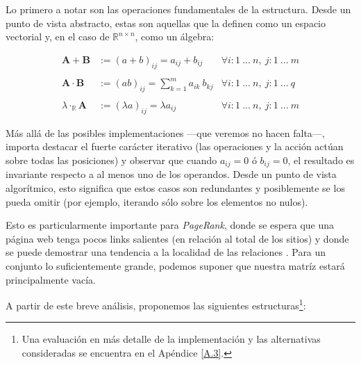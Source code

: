 Lo primero a notar son las operaciones fundamentales de la estructura. Desde un punto de vista abstracto, estas son aquellas que la definen como un espacio vectorial y, en el caso de $\mathbb{R}^{n \times n}$, como un álgebra:
\vspace{1em}

\begin{align*}
    \mathbf{A} + \mathbf{B}     &:= (a + b)_{ij} = a_{ij} + b_{ij}                &   \forall i: 1\ ...\ n,\ j: 1\ ...\ m\\
    \\
    \mathbf{A} \cdot \mathbf{B} &:= (ab)_{ij} = \sum_{k=1}^{m} a_{ik}\ b_{kj}     &   \forall i: 1\ ...\ n,\ j: 1\ ...\ q\\ 
    \\
    \lambda \cdot_{\mathbb{R}} \mathbf{A}  &:= (\lambda a)_{ij} = \lambda a_{ij}  &   \forall i: 1\ ...\ n,\ j: 1\ ...\ m
\end{align*}
\vspace{1em}

Más allá de las posibles implementaciones ---que veremos no hacen falta---, importa destacar el fuerte carácter iterativo (las operaciones y la acción actúan sobre todas las posiciones) y observar que cuando $a_{ij} = 0$ ó $b_{ij} = 0$, el resultado es invariante respecto a al menos uno de los operandos. Desde un punto de vista algorítmico, esto significa que estos casos son redundantes y posiblemente se los pueda omitir (por ejemplo, iterando sólo sobre los elementos no nulos).  
\vspace{1em}


Esto es particularmente importante para \textit{PageRank}, donde se espera que una página web tenga pocos links salientes (en relación al total de los sitios) y donde se puede demostrar una tendencia a la localidad de las relaciones \cite{Langville04}. Para un conjunto lo suficientemente grande, podemos suponer que nuestra matríz estará principalmente vacía. 
\vspace{1em}

\noindent A partir de este breve análisis, proponemos las siguientes estructuras\footnote{Una evaluación en más detalle de la implementación y las alternativas consideradas se encuentra en el Apéndice \ref{A.3}.}:
\vspace{1em}

